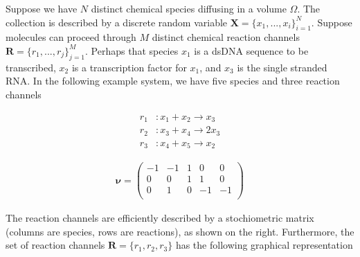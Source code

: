 \documentclass{article}
\begin{document}
Suppose we have $N$ distinct chemical species diffusing in a volume $\Omega$. The collection is described by a discrete random variable $\mathbf{X} = \{x_{1},...,x_{i}\}_{i=1}^{N}$. Suppose molecules can proceed through $M$ distinct chemical reaction channels $\mathbf{R} =  \{r_{1},...,r_{j}\}_{j=1}^{M}$. Perhaps that species $x_{1}$ is a dsDNA sequence to be transcribed, $x_{2}$ is a transcription factor for $x_{1}$, and $x_{3}$ is the single stranded RNA. In the following example system, we have five species and three reaction channels


\begin{center}
\noindent\begin{minipage}{.25\linewidth}
\begin{align*}
r_{1}&: x_{1} + x_{2} \rightarrow x_{3}\\
r_{2}&: x_{3} + x_{4} \rightarrow 2x_{3}\\
r_{3}&: x_{4} + x_{5} \rightarrow x_{2}
\end{align*}
\end{minipage}%
\begin{minipage}{.25\linewidth}
\begin{align*}
\mathbf{\nu} = \begin{pmatrix}
-1 & -1 & 1 & 0 & 0\\
0 & 0 & 1 & 1 & 0\\
0 & 1 & 0 & -1 & -1\\
\end{pmatrix}
\end{align*}
\end{minipage}
\end{center}

The reaction channels are efficiently described by a stochiometric matrix (columns are species, rows are reactions), as shown on the right. Furthermore, the set of reaction channels $\mathbf{R} =  \{r_{1},r_{2},r_{3}\}$ has the following graphical representation

\begin{center}
\end{center}
\end{document}
